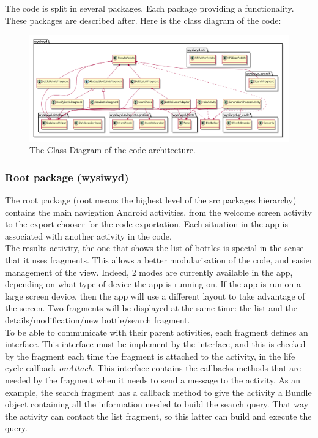 The code is split in several packages. Each package providing a functionality. These packages are described after. Here is the class diagram of the code:
\begin{landscape}
\begin{figure}[H]
\begin{center}
	\includegraphics[width=\textwidth]{Images/ClassDiagram.png}
	\caption{The Class Diagram of the code architecture.}
\end{center}
\end{figure}
\end{landscape}
\subsubsection{Root package (wysiwyd)}

The root package (root means the highest level of the src packages hierarchy) contains the main navigation Android activities, from the welcome screen activity to the export chooser for the code exportation. Each situation in the app is associated with another activity in the code.\\

The results activity, the one that shows the list of bottles is special in the sense that it uses fragments. This allows a better modularisation of the code, and easier management of the view. Indeed, 2 modes are currently available in the app, depending on what type of device the app is running on. If the app is run on a large screen device, then the app will use a different layout to take advantage of the screen. Two fragments will be displayed at the same time: the list and the details/modification/new bottle/search fragment.\\

To be able to communicate with their parent activities, each fragment defines an interface. This interface must be implement by the interface, and this is checked by the fragment each time the fragment is attached to the activity, in the life cycle callback \emph{onAttach}. This interface contains the callbacks methods that are needed by the fragment when it needs to send a message to the activity. As an example, the search fragment has a callback method to give the activity a Bundle object containing all the information needed to build the search query. That way the activity can contact the list fragment, so this latter can build and execute the query.\\

